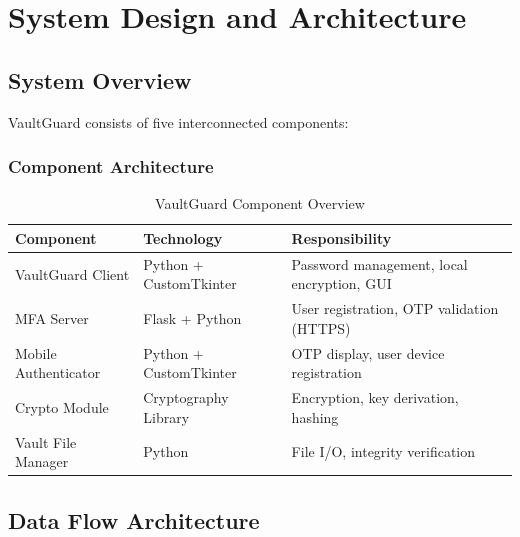 \documentclass[12pt,a4paper]{report}
\begin{document}
\chapter{System Design and Architecture}

\section{System Overview}

VaultGuard consists of five interconnected components:

\subsection{Component Architecture}

\begin{table}[H]
\centering
\begin{tabular}{|p{3cm}|p{4cm}|p{5cm}|}
\hline
\textbf{Component} & \textbf{Technology} & \textbf{Responsibility} \\
\hline
VaultGuard Client & Python + CustomTkinter & Password management, local encryption, GUI \\
MFA Server & Flask + Python & User registration, OTP validation (HTTPS) \\
Mobile Authenticator & Python + CustomTkinter & OTP display, user device registration \\
Crypto Module & Cryptography Library & Encryption, key derivation, hashing \\
Vault File Manager & Python & File I/O, integrity verification \\
\hline
\end{tabular}
\caption{VaultGuard Component Overview}
\end{table}

\section{Data Flow Architecture}
\end{document}
